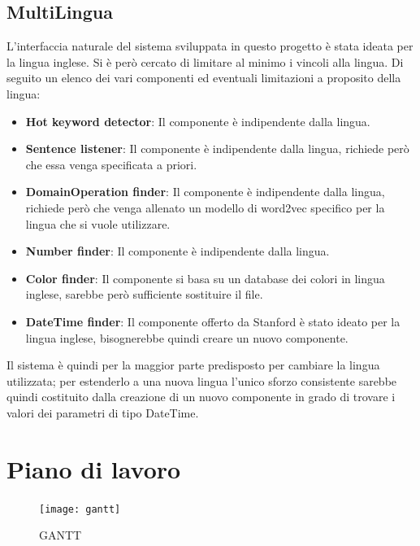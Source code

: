 \documentclass[twoside]{supsistudent}
\begin{document}
\section{MultiLingua}
L'interfaccia naturale del sistema sviluppata in questo progetto è stata ideata per la lingua inglese. Si è però cercato di limitare al minimo i vincoli alla lingua. Di seguito un elenco dei vari componenti ed eventuali limitazioni a proposito della lingua:
\begin{itemize}
      \item \textbf{Hot keyword detector}: Il componente è indipendente dalla lingua.
      \item \textbf{Sentence listener}: Il componente è indipendente dalla lingua, richiede però che essa venga specificata a priori.
      \item \textbf{DomainOperation finder}: Il componente è indipendente dalla lingua, richiede però che venga allenato un modello di word2vec specifico per la lingua che si vuole utilizzare.
      \item \textbf{Number finder}: Il componente è indipendente dalla lingua.
      \item \textbf{Color finder}: Il componente si basa su un database dei colori in lingua inglese, sarebbe però sufficiente sostituire il file.
      \item \textbf{DateTime finder}: Il componente offerto da Stanford è stato ideato per la lingua inglese, bisognerebbe quindi creare un nuovo componente.
\end{itemize}
Il sistema è quindi per la maggior parte predisposto per cambiare la lingua utilizzata; per estenderlo a una nuova lingua l'unico sforzo consistente sarebbe quindi costituito dalla creazione di un nuovo componente in grado di trovare i valori dei parametri di tipo DateTime.
\chapter{Piano di lavoro}
\begin{figure}[H]
\centering
\texttt{[image: gantt]}
\caption{GANTT}
\label{fig:pose}
\end{figure}
\end{document}
